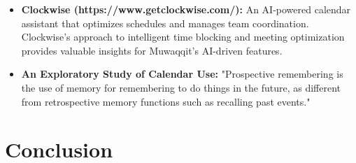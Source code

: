\documentclass[12pt,a4paper]{article}
\begin{document}
\begin{itemize}
    \item \textbf{Clockwise (https://www.getclockwise.com/):} An AI-powered calendar assistant that optimizes schedules and manages team coordination. Clockwise's approach to intelligent time blocking and meeting optimization provides valuable insights for Muwaqqit's AI-driven features.
    \item \textbf{An Exploratory Study of Calendar Use:} "Prospective remembering is the use of memory for remembering to do things in the future, as different from retrospective memory functions such as recalling past events."
\end{itemize}

\section{Conclusion}
\end{document}
